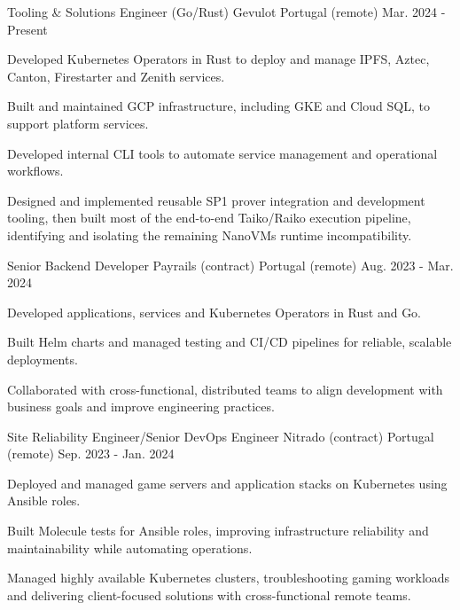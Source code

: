 


\begin{cventries}

\cventry
{Tooling \& Solutions Engineer (Go/Rust)}
{Gevulot}
{Portugal (remote)}
{Mar. 2024 - Present}
{
\begin{cvitems}
\item {Developed Kubernetes Operators in Rust to deploy and manage IPFS, Aztec, Canton, Firestarter and Zenith services.}
\item {Built and maintained GCP infrastructure, including GKE and Cloud SQL, to support platform services.}
\item {Developed internal CLI tools to automate service management and operational workflows.}
\item {Designed and implemented reusable SP1 prover integration and development tooling, then built most of the end-to-end Taiko/Raiko execution pipeline, identifying and isolating the remaining NanoVMs runtime incompatibility.}
\end{cvitems}
}

\cventry
{Senior Backend Developer}
{Payrails (contract)}
{Portugal (remote)}
{Aug. 2023 - Mar. 2024}
{
\begin{cvitems}
\item {Developed applications, services and Kubernetes Operators in Rust and Go.}
\item {Built Helm charts and managed testing and CI/CD pipelines for reliable, scalable deployments.}
\item {Collaborated with cross-functional, distributed teams to align development with business goals and improve engineering practices.}
\end{cvitems}
}

\cventry
{Site Reliability Engineer/Senior DevOps Engineer}
{Nitrado (contract)}
{Portugal (remote)}
{Sep. 2023 - Jan. 2024}
{
\begin{cvitems}
\item {Deployed and managed game servers and application stacks on Kubernetes using Ansible roles.}
\item {Built Molecule tests for Ansible roles, improving infrastructure reliability and maintainability while automating operations.}
\item {Managed highly available Kubernetes clusters, troubleshooting gaming workloads and delivering client-focused solutions with cross-functional remote teams.}
\end{cvitems}
}


\end{cventries}
